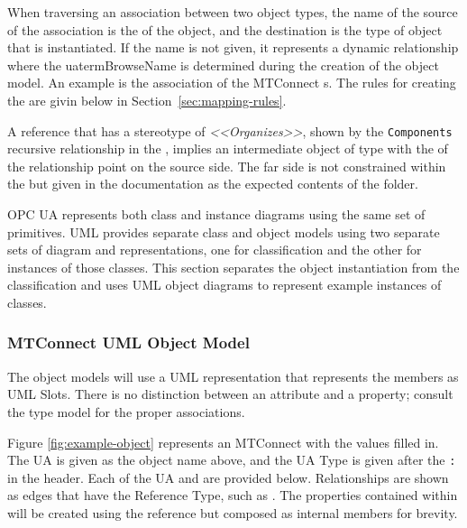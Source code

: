 When traversing an association between two object types, the name of the source of the association is the  of the object, and the destination is the type of object that is instantiated. If the name is not given, it represents a dynamic relationship where the uaterm{BrowseName} is determined during the creation of the object model. An example is the association of the MTConnect s. The rules for creating the  are givin below in Section~\ref{sec:mapping-rules}.

A reference that has a stereotype of \textit{<<Organizes>>}, shown by the \texttt{Components} recursive relationship in the , implies an intermediate object of type  with the  of the relationship point on the source side. The far side is not constrained within the  but given in the documentation as the expected contents of the folder.

OPC UA represents both class and instance diagrams using the same set of primitives. UML provides separate class and object models using two separate sets of diagram and representations, one for classification and the other for instances of those classes. This section separates the object instantiation from the classification and uses UML object diagrams to represent example instances of classes.

\FloatBarrier

\subsubsection{MTConnect UML Object Model}

The object models will use a UML representation that represents the members as UML Slots. There is no distinction between an attribute and a property; consult the type model for the proper associations.



Figure \ref{fig:example-object} represents an MTConnect  with the values filled in. The UA  is given as the object name above, and the UA Type is given after the \texttt{:} in the header. Each of the UA  and  are provided below. Relationships are shown as edges that have the Reference Type, such as . The properties contained within will be created using the  reference but composed as internal members for brevity.

